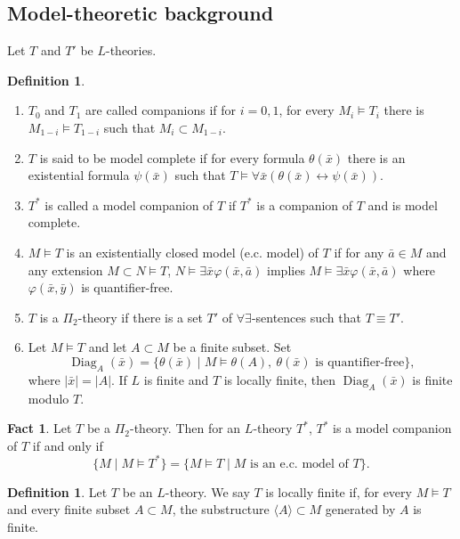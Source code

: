 \documentclass[11pt,reqno]{article}
\theoremstyle{definition}
\newtheorem{definition}[theorem]{Definition}
\newtheorem{fact}[theorem]{Fact}
\theoremstyle{remark}
\DeclareMathOperator{\Diag}{Diag}
\begin{document}
\subsection{Model-theoretic background}

Let $T$ and $T'$ be $L$-theories.
\begin{definition}
    \begin{enumerate}
        \item $T_0$ and $T_1$ are called companions if for $i=0,1$, for every $M_i\models T_i$ there is $M_{1-i}\models T_{1-i}$ such that $M_i\subset M_{1-i}$.
        \item $T$ is said to be model complete if for every formula $\theta(\bar x)$ there is an existential formula $\psi(\bar x)$ such that $T\models \forall \bar x(\theta(\bar x)\leftrightarrow \psi(\bar x))$.
        \item $T^*$ is called a model companion of $T$ if $T^*$ is a companion of $T$ and is model complete.
        \item $M\models T$ is an existentially closed model (e.c. model) of $T$ if for any $\bar a\in M$ and any extension $M\subset N\models T$, $N\models \exists \bar x\varphi(\bar x,\bar a)$ implies $M\models \exists \bar x\varphi(\bar x,\bar a)$ where $\varphi(\bar x,\bar y)$ is quantifier-free.
        \item $T$ is a $\Pi_2$-theory if there is a set $T'$ of $\forall\exists$-sentences such that $T\equiv T'$.
        \item Let $M\models T$ and let $A\subset M$ be a finite subset. Set
        \[
            \Diag_A(\bar x)=\{\theta(\bar x)\mid M\models\theta(A),
            \ \theta(\bar x)\text{ is quantifier-free}\},
        \]
        where $|\bar x|=|A|$. If $L$ is finite and $T$ is locally finite,
        then $\Diag_A(\bar x)$ is finite modulo $T$.
    \end{enumerate}
\end{definition}

\begin{fact}
    Let $T$ be a $\Pi_2$-theory.
    Then for an $L$-theory $T^*$, $T^*$ is a model companion of $T$ if and only if 
    \[
        \{M\mid M\models T^*\}=\{M\models T\mid M\text{ is an e.c. model of $T$}\}.
    \]
\end{fact}

\begin{definition}
    Let $T$ be an $L$-theory.
    We say $T$ is locally finite if, for every $M\models T$ and every finite subset $A\subset M$, the substructure $\langle A\rangle \subset M$ generated by $A$ is finite.
\end{definition}
\end{document}

